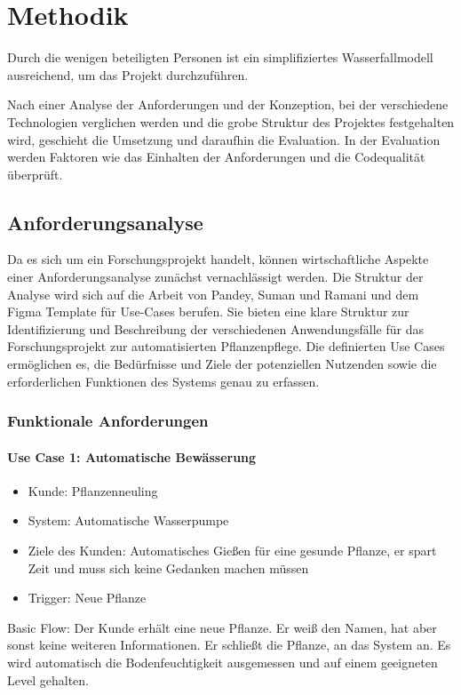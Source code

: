 \section{Methodik} \label{sec_03}
Durch die wenigen beteiligten Personen ist ein simplifiziertes Wasserfallmodell ausreichend, um das Projekt durchzuführen.

Nach einer Analyse der Anforderungen und der Konzeption, bei der verschiedene Technologien verglichen werden und die grobe Struktur des Projektes festgehalten wird, geschieht die Umsetzung und daraufhin die Evaluation. In der Evaluation werden Faktoren wie das Einhalten der Anforderungen und die Codequalität überprüft.

\subsection{Anforderungsanalyse}
Da es sich um ein Forschungsprojekt handelt, können wirtschaftliche Aspekte einer Anforderungsanalyse zunächst vernachlässigt werden. Die Struktur der Analyse wird sich auf die Arbeit von Pandey, Suman und Ramani \cite{pandey2010effective} und dem Figma Template\cite{figma-use-case-template} für Use-Cases berufen. Sie bieten eine klare Struktur zur Identifizierung und Beschreibung der verschiedenen Anwendungsfälle für das Forschungsprojekt zur automatisierten Pflanzenpflege. Die definierten Use Cases ermöglichen es, die Bedürfnisse und Ziele der potenziellen Nutzenden sowie die erforderlichen Funktionen des Systems genau zu erfassen.

\subsubsection{Funktionale Anforderungen}
\paragraph{Use Case 1: Automatische Bewässerung}
\begin{itemize}
    \item Kunde: Pflanzenneuling
    \item System: Automatische Wasserpumpe
    \item Ziele des Kunden: Automatisches Gießen für eine gesunde Pflanze, er spart Zeit und muss sich keine Gedanken machen müssen
    \item Trigger: Neue Pflanze
\end{itemize}

Basic Flow:
Der Kunde erhält eine neue Pflanze. Er weiß den Namen, hat aber sonst keine weiteren Informationen. Er schließt die Pflanze, an das System an. Es wird automatisch die Bodenfeuchtigkeit ausgemessen und auf einem geeigneten Level gehalten.

